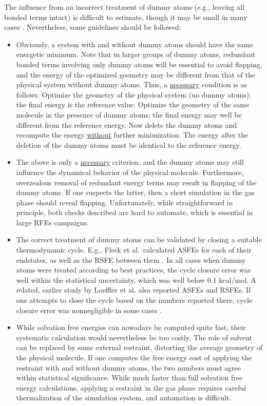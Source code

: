 \documentclass[9pt,bestpractices,pubversion]{livecoms}
\begin{document}
The influence from an incorrect treatment of dummy atoms (e.g., leaving all bonded terms intact) is difficult to estimate, though it may be small in many cases \cite{Fleck_2021}. Nevertheless, some guidelines should be followed:
\begin{itemize}
  \item Obviously, a system with and without dummy atoms should have the same energetic minimum. Note that in larger groups of dummy atoms, redundant bonded terms involving only dummy atoms will be essential to avoid flapping, and the energy of the optimized geometry may be different from that of the physical system without dummy atoms. Thus, a \underline{necessary} condition is as follows: Optimize the geometry of the physical system (no dummy atoms); the final energy is the reference value. Optimize the geometry of the same molecule in the presence of dummy atoms; the final energy may well be different from the reference energy. Now delete the dummy atoms and recompute the energy \underline{without} further minimization. The energy after the deletion of the dummy atoms must be identical to the reference energy. 
\item The above is only a \underline{necessary} criterion, and the dummy atoms may still influence the dynamical behavior of the physical molecule. Furthermore, overzealous removal of redundant energy terms may result in flapping of the dummy atoms. If one suspects the latter, then a short simulation in the gas phase should reveal flapping. Unfortunately, while straightforward in principle, both checks described are hard to automate, which is essential in large RFEs campaigns. 
\item The correct treatment of dummy atoms can be validated by closing a suitable thermodynamic cycle.  E.g., Fleck et al.\ calculated ASFEs for each of their endstates, as well as the RSFE between them \cite{Fleck_2021}. In all cases when dummy atoms were treated according to best practices, the cycle closure error was well within the statistical uncertainty, which was well below 0.1 kcal/mol. A related, earlier study by Loeffler et al. also reported ASFEs and RSFEs. If one attempts to close the cycle based on the numbers reported there, cycle closure error was nonnegligible in some cases \cite{loeffler2018reproducibility}. 
\item While solvation free energies can nowadays be computed quite fast, their systematic calculation would nevertheless be too costly. The role of solvent can be replaced by some external restraint, distorting the average geometry of the physical molecule. If one computes the free energy cost of applying the restraint with and without dummy atoms, the two numbers must agree within statistical significance. While much faster than full solvation free energy calculations, applying a restraint in the gas phase requires careful thermalization of the simulation system, and automation is difficult.
  \end{itemize}
\end{document}
